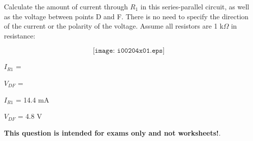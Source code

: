 

Calculate the amount of current through $R_1$ in this series-parallel circuit, as well as the voltage between points D and F.  There is no need to specify the direction of the current or the polarity of the voltage.  Assume all resistors are 1 k$\Omega$ in resistance:

$$\texttt{[image: i00204x01.eps]}$$

$I_{R1}$ = 

\vskip 10pt

$V_{DF}$ = 

\vskip 10pt







$I_{R1}$ = 14.4 mA

\vskip 10pt

$V_{DF}$ = 4.8 V







{\bf This question is intended for exams only and not worksheets!}.



